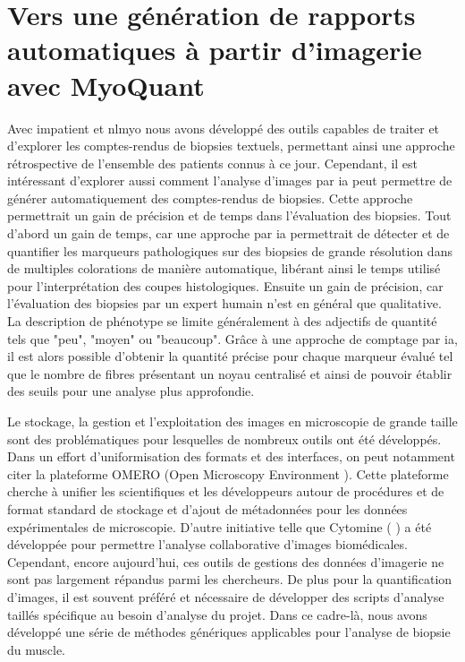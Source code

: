 \chapter{Vers une génération de rapports automatiques à partir d’imagerie avec MyoQuant}
Avec \gls{impatient} et \gls{nlmyo}  nous avons développé des outils capables de traiter et d'explorer les comptes-rendus de biopsies textuels, permettant ainsi une approche rétrospective de l'ensemble des patients connus à ce jour. Cependant, il est intéressant d'explorer aussi comment l'analyse d'images par \gls{ia} peut permettre de générer automatiquement des comptes-rendus de biopsies. Cette approche permettrait un gain de précision et de temps dans l'évaluation des biopsies. Tout d'abord un gain de temps, car une approche par \gls{ia} permettrait de détecter et de quantifier les marqueurs pathologiques sur  des biopsies de grande résolution dans de multiples colorations de manière automatique, libérant ainsi le temps utilisé pour l'interprétation des coupes histologiques. Ensuite un gain de précision, car l'évaluation des biopsies par un expert humain n'est en général que qualitative. La description de phénotype se limite généralement à des adjectifs de quantité tels que "peu", "moyen" ou "beaucoup". Grâce à une approche de comptage par \gls{ia}, il est alors possible d'obtenir la quantité précise pour chaque marqueur évalué tel que le nombre de fibres présentant un noyau centralisé et ainsi de pouvoir établir des seuils pour une analyse plus approfondie.


Le stockage, la gestion et l'exploitation des images en microscopie de grande taille sont des problématiques pour lesquelles de nombreux outils ont été développés. Dans un effort d'uniformisation des formats et des interfaces, on peut notamment citer la plateforme OMERO (Open Microscopy Environment \cite{allan_omero_2012}). Cette plateforme cherche à unifier les scientifiques et les développeurs autour de procédures et de format standard de stockage et d'ajout de métadonnées pour les données expérimentales de microscopie. D'autre initiative telle que Cytomine (\cite{maree_collaborative_2016} ) a été développée pour permettre l'analyse collaborative d'images biomédicales. Cependant, encore aujourd'hui, ces outils de gestions des données d'imagerie ne sont pas largement répandus parmi les chercheurs. De plus pour la quantification d'images, il est souvent préféré et nécessaire de développer des scripts d'analyse taillés spécifique au besoin d'analyse du projet. Dans ce cadre-là, nous avons développé une série de méthodes génériques applicables pour l'analyse de biopsie du muscle.

